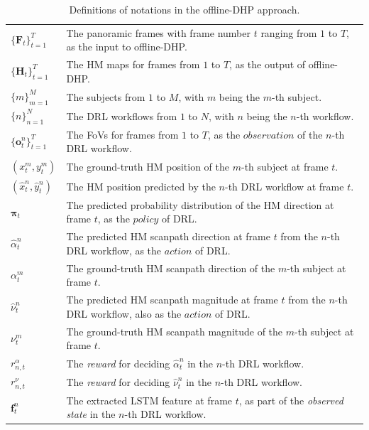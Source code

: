 \documentclass[10pt,journal,compsoc]{IEEEtran}
\begin{document}
\begin{table}
\vspace{-1em}
\center
\caption{Definitions of notations in the offline-DHP approach.} \label{notation_framework}
\vspace{-1em}
\begin{tabular}{ll}
$\{\mathbf{F}_t\}_{t=1}^{T}$ & The panoramic frames with frame number $t$ ranging from $1$ to $T$, as the input to offline-DHP.\\
$\{\mathbf{H}_t\}_{t=1}^{T}$ & The HM maps for frames from $1$ to $T$, as the output of offline-DHP.\\
$\{m\}_{m=1}^{M}$ & The subjects from $1$ to $M$, with $m$ being the $m$-th subject.\\
$\{n\}_{n=1}^{N}$ & The DRL workflows from $1$ to $N$, with $n$ being the $n$-th workflow.\\
$\{\mathbf{o}^n_t\}_{t=1}^{T}$ & The FoVs for frames from $1$ to $T$, as the $observation$ of the $n$-th DRL workflow. \\
$(x^m_t, y^m_t)$ & The ground-truth HM position of the $m$-th subject at frame $t$. \\
$(\hat{x}^n_t, \hat{y}^n_t)$ & The HM position predicted by the $n$-th DRL workflow at frame $t$.  \\
$\mathbf{\pi}_t$ & The predicted probability distribution of the HM direction at frame $t$, as the $policy$ of DRL. \\
$\hat{\alpha}^n_t$ & The predicted HM scanpath direction at frame $t$ from the $n$-th DRL workflow, as the $action$ of DRL.\\
$\alpha^m_t$ & The ground-truth HM scanpath direction of the $m$-th subject at frame $t$. \\
$\hat{\nu}^n_t$ & The predicted HM scanpath magnitude at frame $t$ from the $n$-th DRL workflow, also as the $action$ of DRL.\\
$\nu^m_t$ & The ground-truth HM scanpath magnitude of the $m$-th subject at frame $t$. \\
$r^{\alpha}_{n,t}$ & The \textit{reward} for deciding $\hat{\alpha}^n_t$ in the $n$-th DRL workflow.\\
$r^{\nu}_{n,t}$ & The \textit{reward} for deciding $\hat{\nu}^n_t$ in  the $n$-th DRL workflow.\\
$\mathbf{f}^n_{t}$ & The extracted LSTM feature at frame $t$,  as part of the \textit{observed state} in the $n$-th DRL workflow. \\
\end{tabular}
\vspace{-1em}
\end{table}
\end{document}
